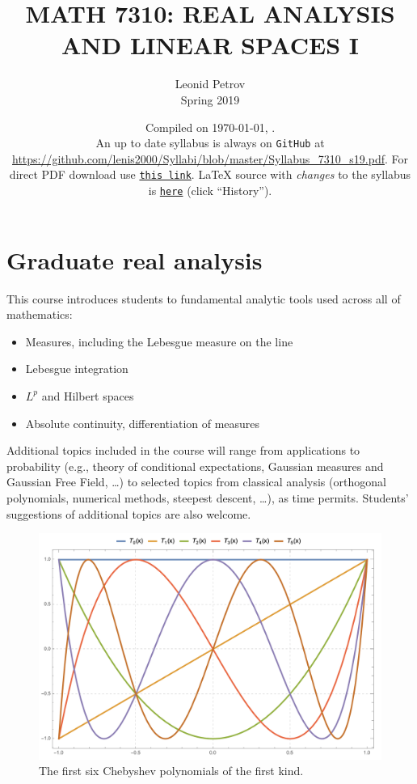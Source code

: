 \documentclass[oneside,11pt]{amsart}
\begin{document}
\title[MATH 7310: REAL ANALYSIS AND LINEAR SPACES I]{MATH 7310: REAL ANALYSIS AND LINEAR SPACES I}
\author{Leonid Petrov\\Spring 2019}
\date{Compiled on \today, \currenttime.\\An up to date syllabus is always on \texttt{GitHub} at \url{https://github.com/lenis2000/Syllabi/blob/master/Syllabus_7310_s19.pdf}. For direct PDF download use \href{https://github.com/lenis2000/Syllabi/raw/master/Syllabus_7310_s19.pdf}{\texttt{this link}}.
	\LaTeX{} source with \textit{changes} to the syllabus is \href{https://github.com/lenis2000/Syllabi/blob/master/Syllabus_7310_s19.tex}{\texttt{here}}
(click ``History'').}
\maketitle

\bigskip

\section{Graduate real analysis}
\bigskip

This course introduces students to fundamental analytic tools used across all of mathematics:
\begin{itemize}
	\item Measures, including the Lebesgue measure on the line
	\item Lebesgue integration
	\item $L^p$ and Hilbert spaces
	\item Absolute continuity, differentiation of measures
\end{itemize}

Additional topics included in the course will range from applications to 
probability (e.g., theory of conditional expectations, Gaussian measures and Gaussian Free Field, \ldots)
to selected topics from classical analysis (orthogonal polynomials, numerical methods, steepest descent, \ldots),
as time permits.
Students' suggestions of additional topics are also welcome.

\begin{figure}[h]
	\includegraphics[height=.32\textwidth]{img/chebyshev.png}
	\caption{The first six Chebyshev polynomials of the first kind.}
\end{figure}
\end{document}
